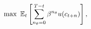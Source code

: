 \begin{equation}\label{eq:MaxProb}
\max ~ \mathbb{E}_{t}\left[ \sum_{n_{\theta}=0}^{T-t} {\beta}^{n_{\theta}} u({c}_{t+n})\right],
\end{equation}
